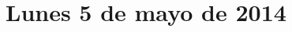 \documentclass[12pt,spanish]{article}
\begin{document}
  \thispagestyle{empty}
  \pagestyle{empty}
  \section*{Lunes 5 de mayo de 2014}

  \begin{certamen}[start=0]
    \item
      
      \newpage
    \item
      
      \newpage
    \item
      
      \newpage
    \item
      
      \newpage
  \end{certamen}
\end{document}
